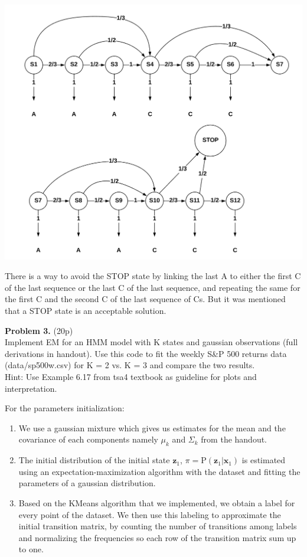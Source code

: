 \documentclass[12pt]{article}
\newcommand{\p}[1]{\mathrm{P}\left(#1 \right)}
\newcommand{\vect}[1]{\mathbf{#1}}
\begin{document}
\begin{center}
	\includegraphics[width=1\linewidth]{figures/problem-2-2.png} 
\end{center}
 There is a way to avoid the STOP state by linking the last A to either the first C of the last sequence or the last C of the last sequence, and repeating the same for the first C and the second C of the last sequence of Cs.
 But it was mentioned that a STOP state is an acceptable solution.

\noindent \textbf{Problem 3.}  (20p)\\ 
Implement EM for an HMM model with K states and gaussian observations (full derivations in handout). 
Use this code to fit the weekly S\&P 500 returns data (data/sp500w.csv) for K = 2 vs. K = 3 and compare the two results. \\
Hint: Use Example 6.17 from tsa4 textbook as guideline for plots and interpretation.


For the parameters initialization:
\begin{enumerate}
	\item We use a gaussian mixture which gives us estimates for the mean and the covariance of each components namely $\mu_k$ and $\Sigma_k$ from
the handout.
	\item  The initial distribution of the initial state $\vect{z}_1$, $\pi=\p{\vect{z}_1|\vect{x}_1}$ is estimated using an expectation-maximization algorithm with the dataset and fitting the parameters of a gaussian distribution.
	\item Based on the KMeans algorithm that we implemented, we obtain a label for every point of the dataset. We then use this labeling to approximate the initial transition matrix, by counting the number of transitions among labels 
and normalizing the frequencies so each row of the transition matrix sum up to one.
\end{enumerate}
\end{document}
